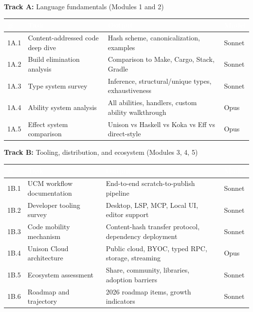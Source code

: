 \documentclass[11pt,letterpaper]{article}
\newcommand{\tableheader}[1]{\textbf{\sffamily\textcolor{white}{#1}}}
\begin{document}
\textbf{Track A:} Language fundamentals (Modules 1 and 2)

\begin{center}
\begin{tabularx}{\textwidth}{C{0.5cm}L{3cm}XC{1.5cm}}
\toprule
{}
\tableheader{\#} & \tableheader{Task} & \tableheader{Output} & \tableheader{Model} \\
\midrule
1A.1 & Content-addressed code deep dive & Hash scheme, canonicalization, examples & Sonnet \\
1A.2 & Build elimination analysis & Comparison to Make, Cargo, Stack, Gradle & Sonnet \\
1A.3 & Type system survey & Inference, structural/unique types, exhaustiveness & Sonnet \\
1A.4 & Ability system analysis & All abilities, handlers, custom ability walkthrough & Opus \\
1A.5 & Effect system comparison & Unison vs Haskell vs Koka vs Eff vs direct-style & Opus \\
\bottomrule
\end{tabularx}
\end{center}

\textbf{Track B:} Tooling, distribution, and ecosystem (Modules 3, 4, 5)

\begin{center}
\begin{tabularx}{\textwidth}{C{0.5cm}L{3cm}XC{1.5cm}}
\toprule
{}
\tableheader{\#} & \tableheader{Task} & \tableheader{Output} & \tableheader{Model} \\
\midrule
1B.1 & UCM workflow documentation & End-to-end scratch-to-publish pipeline & Sonnet \\
1B.2 & Developer tooling survey & Desktop, LSP, MCP, Local UI, editor support & Sonnet \\
1B.3 & Code mobility mechanism & Content-hash transfer protocol, dependency deployment & Sonnet \\
1B.4 & Unison Cloud architecture & Public cloud, BYOC, typed RPC, storage, streaming & Opus \\
1B.5 & Ecosystem assessment & Share, community, libraries, adoption barriers & Sonnet \\
1B.6 & Roadmap and trajectory & 2026 roadmap items, growth indicators & Sonnet \\
\bottomrule
\end{tabularx}
\end{center}
\end{document}

